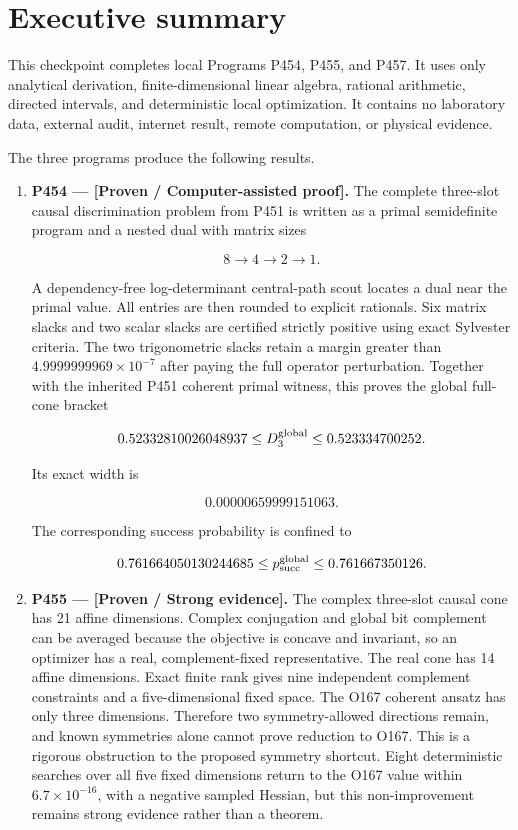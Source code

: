 \documentclass[11pt,a4paper,openany]{report}
\begin{document}
\chapter{Executive summary}

This checkpoint completes local Programs P454, P455, and P457. It uses only analytical derivation, finite-dimensional linear algebra, rational arithmetic, directed intervals, and deterministic local optimization. It contains no laboratory data, external audit, internet result, remote computation, or physical evidence.

The three programs produce the following results.

\begin{enumerate}
\item 
\textbf{P454 --- [Proven /\allowbreak{} Computer-assisted proof].} The complete three-slot causal discrimination problem from P451 is written as a primal semidefinite program and a nested dual with matrix sizes

\[
   8\longrightarrow4\longrightarrow2\longrightarrow1.
   \]

A dependency-free log-determinant central-path scout locates a dual near the primal value. All entries are then rounded to explicit rationals. Six matrix slacks and two scalar slacks are certified strictly positive using exact Sylvester criteria. The two trigonometric slacks retain a margin greater than \(4.9999999969\times10^{-7}\) after paying the full operator perturbation. Together with the inherited P451 coherent primal witness, this proves the global full-cone bracket

\[
   0.52332810026048937
   \le D_3^{\rm global}
   \le0.523334700252.
   \]

Its exact width is

\[
   0.00000659999151063.
   \]

The corresponding success probability is confined to

\[
   0.761664050130244685
   \le p_{\rm succ}^{\rm global}
   \le0.761667350126.
   \]

\item 
\textbf{P455 --- [Proven /\allowbreak{} Strong evidence].} The complex three-slot causal cone has 21 affine dimensions. Complex conjugation and global bit complement can be averaged because the objective is concave and invariant, so an optimizer has a real, complement-fixed representative. The real cone has 14 affine dimensions. Exact finite rank gives nine independent complement constraints and a five-dimensional fixed space. The O167 coherent ansatz has only three dimensions. Therefore two symmetry-allowed directions remain, and known symmetries alone cannot prove reduction to O167. This is a rigorous obstruction to the proposed symmetry shortcut. Eight deterministic searches over all five fixed dimensions return to the O167 value within \(6.7\times10^{-16}\), with a negative sampled Hessian, but this non-improvement remains strong evidence rather than a theorem.


\end{enumerate}
\end{document}
